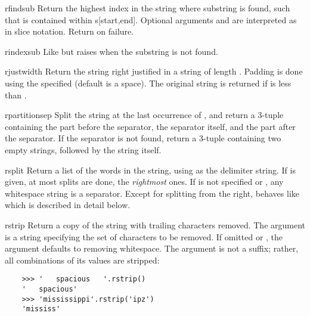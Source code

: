 \begin{methoddesc}[string]{rfind}{sub }
Return the highest index in the string where substring  is
found, such that  is contained within s[start,end].  Optional
arguments  and  are interpreted as in slice
notation.  Return  on failure.
\end{methoddesc}

\begin{methoddesc}[string]{rindex}{sub}
Like  but raises  when the
substring  is not found.
\end{methoddesc}

\begin{methoddesc}[string]{rjust}{width}
Return the string right justified in a string of length .
Padding is done using the specified  (default is a space).
The original string is returned if
 is less than .
\end{methoddesc}

\begin{methoddesc}[string]{rpartition}{sep}
Split the string at the last occurrence of , and return
a 3-tuple containing the part before the separator, the separator
itself, and the part after the separator.  If the separator is not
found, return a 3-tuple containing two empty strings, followed by
the string itself.
\end{methoddesc}

\begin{methoddesc}[string]{rsplit}{}
Return a list of the words in the string, using  as the
delimiter string.  If  is given, at most 
splits are done, the \emph{rightmost} ones.  If  is not specified
or , any whitespace string is a separator.  Except for splitting
from the right,  behaves like  which
is described in detail below.
\end{methoddesc}

\begin{methoddesc}[string]{rstrip}{}
Return a copy of the string with trailing characters removed.  The
 argument is a string specifying the set of characters
to be removed.  If omitted or , the  argument
defaults to removing whitespace.  The  argument is not
a suffix; rather, all combinations of its values are stripped:
\begin{verbatim}
    >>> '   spacious   '.rstrip()
    '   spacious'
    >>> 'mississippi'.rstrip('ipz')
    'mississ'
\end{verbatim}
\end{methoddesc}

